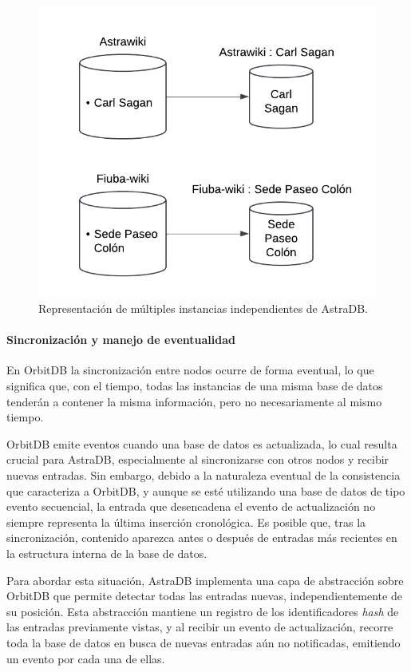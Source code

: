 \begin{figure}[H]
\centering
\includegraphics[width=0.6\linewidth]{img/solucion-ipfs/bdd-multiple.png}
\caption{Representación de múltiples instancias independientes de AstraDB.}
\label{fig:bdd-multiple}
\end{figure}

\paragraph{Sincronización y manejo de eventualidad}

En OrbitDB la sincronización entre nodos ocurre de forma eventual, lo que significa que, con el tiempo, todas las instancias de una misma base de datos tenderán a contener la misma información, pero no necesariamente al mismo tiempo. 

OrbitDB emite eventos cuando una base de datos es actualizada, lo cual resulta crucial para AstraDB, especialmente al sincronizarse con otros nodos y recibir nuevas entradas. Sin embargo, debido a la naturaleza eventual de la consistencia que caracteriza a OrbitDB, y aunque se esté utilizando una base de datos de tipo evento secuencial, la entrada que desencadena el evento de actualización no siempre representa la última inserción cronológica. Es posible que, tras la sincronización, contenido aparezca antes o después de entradas más recientes en la estructura interna de la base de datos.

Para abordar esta situación, AstraDB implementa una capa de abstracción sobre OrbitDB que permite detectar todas las entradas nuevas, independientemente de su posición. Esta abstracción mantiene un registro de los identificadores \textit{hash} de las entradas previamente vistas, y al recibir un evento de actualización, recorre toda la base de datos en busca de nuevas entradas aún no notificadas, emitiendo un evento por cada una de ellas.

